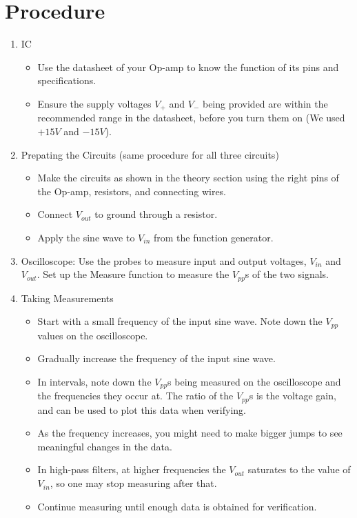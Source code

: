 \documentclass[a4paper,12pt]{article}
\begin{document}
\section{Procedure}
\begin{enumerate}
	\item IC
		\begin{itemize}
			\item Use the datasheet of your Op-amp to know the function of its pins and specifications.
			\item Ensure the supply voltages $V_+$ and $V_-$ being provided are within the recommended range in the datasheet, before you turn them on (We used $+15V$ and $-15V$).
		\end{itemize}
	\item Prepating the Circuits (same procedure for all three circuits)
		\begin{itemize}
			\item Make the circuits as shown in the theory section using the right pins of the Op-amp, resistors, and connecting wires. 
			\item Connect $V_{out}$ to ground through a resistor. 
			\item Apply the sine wave to $V_{in}$ from the function generator. 
		\end{itemize}
	\item Oscilloscope: Use the probes to measure input and output voltages, $V_{in}$ and $V_{out}$. Set up the Measure function to measure the $V_{pp}$s of the two signals.
	\item Taking Measurements
		\begin{itemize}
			\item Start with a small frequency of the input sine wave. Note down the $V_{pp}$ values on the oscilloscope. 
			\item Gradually increase the frequency of the input sine wave.
			\item In intervals, note down the $V_{pp}$s being measured on the oscilloscope and the frequencies they occur at. The ratio of the $V_{pp}$s is the voltage gain, and can be used to plot this data when verifying.
			\item As the frequency increases, you might need to make bigger jumps to see meaningful changes in the data.
			\item In high-pass filters, at higher frequencies the $V_{out}$ saturates to the value of $V_{in}$, so one may stop measuring after that.
			\item Continue measuring until enough data is obtained for verification.

\end{itemize}
\end{enumerate}
\end{document}
